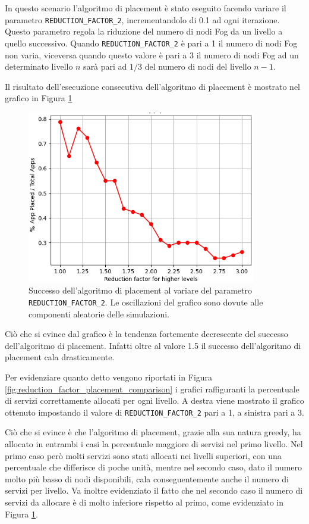 In questo scenario l'algoritmo di placement è stato eseguito facendo variare il parametro \texttt{REDUCTION\_FACTOR\_2}, incrementandolo di 0.1 ad ogni iterazione. Questo parametro regola la riduzione del numero di nodi Fog da un livello a quello successivo. Quando \texttt{REDUCTION\_FACTOR\_2} è pari a 1 il numero di nodi Fog non varia, viceversa quando questo valore è pari a 3 il numero di nodi Fog ad un determinato livello $n$ sarà pari ad $1/3$ del numero di nodi del livello $n-1$.

Il risultato dell'esecuzione consecutiva dell'algoritmo di placement è mostrato nel grafico in Figura \ref{fig:nodes_number_placement_success}

\begin{figure}[!ht]
  \includegraphics[width=10cm]{images/nodes_number_placement_success}
  \centering
  \caption{Successo dell'algoritmo di placement al variare del parametro \texttt{REDUCTION\_FACTOR\_2}. Le oscillazioni del grafico sono dovute alle componenti aleatorie delle simulazioni.}
  \label{fig:nodes_number_placement_success}
\end{figure}

Ciò che si evince dal grafico è la tendenza fortemente decrescente del successo dell'algoritmo di placement. Infatti oltre al valore 1.5 il successo dell'algoritmo di placement cala drasticamente. 

Per evidenziare quanto detto vengono riportati in Figura \ref{fig:reduction_factor_placement_comparison} i grafici raffiguranti la percentuale di servizi correttamente allocati per ogni livello. A destra viene mostrato il grafico ottenuto impostando il valore di \texttt{REDUCTION\_FACTOR\_2} pari a 1, a sinistra pari a 3. 

Ciò che si evince è che l'algoritmo di placement, grazie alla sua natura greedy, ha allocato in entrambi i casi la percentuale maggiore di servizi nel primo livello. Nel primo caso però molti servizi sono stati allocati nei livelli superiori, con una percentuale che differisce di poche unità, mentre nel secondo caso, dato il numero molto più basso di nodi disponibili, cala conseguentemente anche il numero di servizi per livello. Va inoltre evidenziato il fatto che nel secondo caso il numero di servizi da allocare è di molto inferiore rispetto al primo, come evidenziato in Figura \ref{fig:nodes_number_placement_success}.

